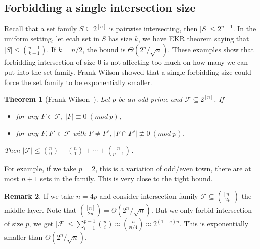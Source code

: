\documentclass{article}
\newtheorem{theorem}{Theorem}[section]
\theoremstyle{definition}
\newtheorem{remark}[theorem]{Remark}
\begin{document}
\subsection{Forbidding a single intersection size}

Recall that a set family $S\subseteq 2^{[n]}$ is pairwise intersecting, then $|S|\leq 2^{n-1}$. In the uniform setting, let ecah set in $S$ has size $k$, we have EKR theorem saying that $|S|\leq \binom{n-1}{k-1}$. If $k=n/2$, the bound is $\Theta(2^{n}/\sqrt{n})$. These examples show that forbidding intersection of size $0$ is not affecting too much on how many we can put into the set family. Frank-Wilson showed that a single forbidding size could force the set family to be exponentially smaller.

\begin{theorem}[Frank-Wilson~\cite{frankl1981intersection}]\label{frank wilson}
    Let $p$ be an odd prime and $\mathcal{F}\subseteq 2^{[n]}$. If
    
    \begin{itemize}
        \item for any $F\in \mathcal{F}$, $|F|\equiv 0\ (mod\ p)$,
        \item for any $F,F'\in \mathcal{F}$ with $F\neq F'$, $|F\cap F'|\not\equiv 0\ (mod\ p)$.
    \end{itemize}
    
    Then $|\mathcal{F}|\leq \binom{n}{0}+\binom{n}{1}+\cdots+\binom{n}{p-1}$.
\end{theorem}

For example, if we take $p=2$, this is a variation of odd/even town, there are at most $n+1$ sets in the family. This is very close to the tight bound.

\begin{remark}
    If we take $n=4p$ and consider intersection family $\mathcal{F}\subseteq\binom{[n]}{2p}$ the middle layer. Note that $\binom{[n]}{2p}=\Theta(2^{n}/\sqrt{n})$. But we only forbid intersection of size $p$, we get $|\mathcal{F}|\leq \sum_{i=1}^{p-1}\binom{n}{i}\approx \binom{n}{n/4}\approx 2^{(1-c)n}$. This is exponentially smaller than $\Theta(2^{n}/\sqrt{n})$.
\end{remark}
\end{document}
